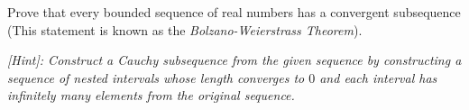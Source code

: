 \begin{problem}
  Prove that every bounded sequence of real numbers has a convergent subsequence
  (This statement is known as the \emph{Bolzano-Weierstrass Theorem}).

  \emph{
    [Hint]: Construct a Cauchy subsequence from the given sequence
    by constructing a sequence of nested intervals whose length converges to $0$
    and each  interval has infinitely many elements from the original sequence.
  }
\end{problem}
\begin{answer}
  
\end{answer}
